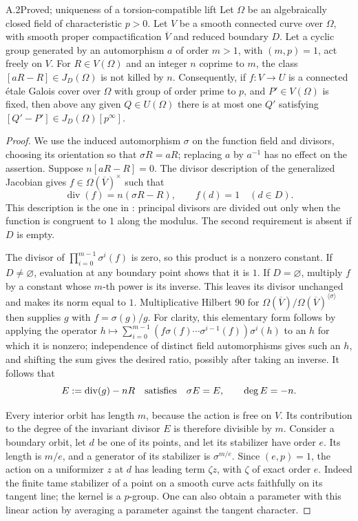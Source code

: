 \begin{claim}{A.2}{Proved; uniqueness of a torsion-compatible lift}
Let $\Omega$ be an algebraically closed field of characteristic $p>0$.
Let $V$ be a smooth connected curve over $\Omega$, with smooth proper
compactification $\overline V$ and reduced boundary $D$. Let a cyclic
group generated by an automorphism $a$ of order $m>1$, with $(m,p)=1$,
act freely on $V$. For $R\in V(\Omega)$ and an integer $n$ coprime to
$m$, the class $[aR-R]\in J_D(\Omega)$ is not killed by $n$.
Consequently, if $f:V\to U$ is a connected \'etale Galois cover over
$\Omega$ with group of order prime to $p$, and $P'\in V(\Omega)$ is
fixed, then above any given $Q\in U(\Omega)$ there is at most one
$Q'$ satisfying $[Q'-P']\in J_D(\Omega)[p^\infty]$.
\end{claim}
\begin{proof}
We use the induced automorphism $\sigma$ on the function field and
divisors, choosing its orientation so that $\sigma R=aR$; replacing
$a$ by $a^{-1}$ has no effect on the assertion. Suppose
$n[aR-R]=0$. The divisor description of the generalized Jacobian
gives $f\in\Omega(\overline V)^\times$ such that
\[
 \operatorname{div}(f)=n(\sigma R-R),\qquad
 f(d)=1\quad(d\in D).
\]
This description is the one in \citet[III, \S8]{A_Milne2008}:
principal divisors are divided out only when the function is congruent
to $1$ along the modulus. The second requirement is absent if $D$ is
empty.

The divisor of $\prod_{i=0}^{m-1}\sigma^i(f)$ is zero, so this product
is a nonzero constant. If $D\ne\varnothing$, evaluation at any
boundary point shows that it is $1$. If $D=\varnothing$, multiply
$f$ by a constant whose $m$-th power is its inverse. This leaves its
divisor unchanged and makes its norm equal to $1$.
Multiplicative Hilbert 90 for
$\Omega(\overline V)/\Omega(\overline V)^{\langle\sigma\rangle}$
then supplies $g$ with $f=\sigma(g)/g$. For clarity, this elementary
form follows by applying the operator
$h\mapsto\sum_{i=0}^{m-1}(f\sigma(f)\cdots\sigma^{i-1}(f))
\sigma^i(h)$ to an $h$ for which it is nonzero; independence of
distinct field automorphisms gives such an $h$, and shifting the sum
gives the desired ratio, possibly after taking an inverse.
It follows that
\[
 E:=\operatorname{div}(g)-nR\quad\hbox{satisfies}\quad
 \sigma E=E,
 \qquad \deg E=-n.
\]

Every interior orbit has length $m$, because the action is free on
$V$. Its contribution to the degree of the invariant divisor $E$ is
therefore divisible by $m$. Consider a boundary orbit, let $d$ be
one of its points, and let its stabilizer have order $e$. Its length
is $m/e$, and a generator of its stabilizer is
$\sigma^{m/e}$. Since $(e,p)=1$, the action on a uniformizer $z$ at
$d$ has leading term $\zeta z$, with $\zeta$ of exact order $e$.
Indeed the finite tame stabilizer of a point on a smooth curve acts
faithfully on its tangent line; the kernel is a $p$-group. One can
also obtain a parameter with this linear action by averaging a
parameter against the tangent character.


\end{proof}
